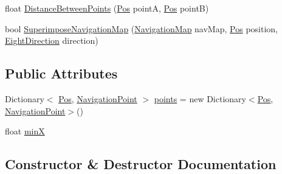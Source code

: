 \begin{DoxyCompactItemize}
\item 
float \mbox{\hyperlink{class_stompy_blondie_1_1_a_i_1_1_navigation_map_a0ce1fac02a5a31b904baada6aff83bcd}{Distance\+Between\+Points}} (\mbox{\hyperlink{struct_stompy_blondie_1_1_common_1_1_types_1_1_pos}{Pos}} pointA, \mbox{\hyperlink{struct_stompy_blondie_1_1_common_1_1_types_1_1_pos}{Pos}} pointB)
\item 
bool \mbox{\hyperlink{class_stompy_blondie_1_1_a_i_1_1_navigation_map_a059f94fa6e73419756517f761f2bb3f5}{Superimpose\+Navigation\+Map}} (\mbox{\hyperlink{class_stompy_blondie_1_1_a_i_1_1_navigation_map}{Navigation\+Map}} nav\+Map, \mbox{\hyperlink{struct_stompy_blondie_1_1_common_1_1_types_1_1_pos}{Pos}} position, \mbox{\hyperlink{namespace_stompy_blondie_1_1_common_1_1_types_a67d21ccf6a23cdea91c271cce76f920f}{Eight\+Direction}} direction)
\end{DoxyCompactItemize}
\subsection*{Public Attributes}
\begin{DoxyCompactItemize}
\item 
Dictionary$<$ \mbox{\hyperlink{struct_stompy_blondie_1_1_common_1_1_types_1_1_pos}{Pos}}, \mbox{\hyperlink{struct_stompy_blondie_1_1_a_i_1_1_navigation_point}{Navigation\+Point}} $>$ \mbox{\hyperlink{class_stompy_blondie_1_1_a_i_1_1_navigation_map_af4f71225b8d491f23974e2b4cf2d18e9}{points}} = new Dictionary$<$\mbox{\hyperlink{struct_stompy_blondie_1_1_common_1_1_types_1_1_pos}{Pos}}, \mbox{\hyperlink{struct_stompy_blondie_1_1_a_i_1_1_navigation_point}{Navigation\+Point}}$>$()
\item 
float \mbox{\hyperlink{class_stompy_blondie_1_1_a_i_1_1_navigation_map_a2db7ec95521970ba1e2eafbeaf3418fc}{minX}}
\end{DoxyCompactItemize}


\subsection{Constructor \& Destructor Documentation}
\mbox{\label{class_stompy_blondie_1_1_a_i_1_1_navigation_map_a0e5a432873f28ea782cb925c36610815}} 
